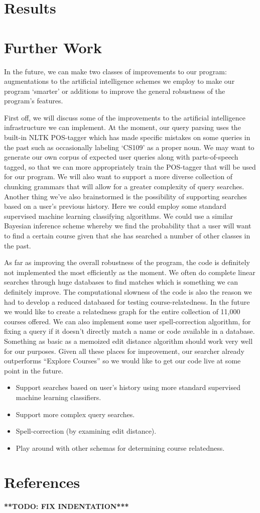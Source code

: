\documentclass[12pt]{article}
\newcommand{\todo}[1]{{\Large \bf ***TODO: #1***}}
\begin{document}
\section*{Results}
	
\section*{Further Work}

In the future, we can make two classes of improvements to our program: augmentations to 
the artificial intelligence schemes we employ to make our program `smarter' or additions to
improve the general robustness of the program's features.

First off, we will discuss some of the improvements to the artificial intelligence infrastructure
we can implement. At the moment, our query parsing uses the built-in NLTK POS-tagger which
has made specific mistakes on some queries in the past such as occasionally labeling `CS109' as a proper noun. We may want to generate our own corpus of expected user queries along with parts-of-speech tagged, so that we can more appropriately train the POS-tagger that will be used for our program. We will also want to support a more diverse collection of chunking grammars that will allow for a greater complexity of query searches. Another thing we've also brainstormed is the possibility of supporting searches based on a user's previous history. Here we could employ some standard supervised machine learning classifying algorithms. We could use a similar Bayesian inference scheme whereby we find the probability that a user will want to find a certain course given that she has searched a number of other classes in the past.

As far as improving the overall robustness of the program, the code is definitely not implemented the most efficiently as the moment. We often do complete linear searches through huge databases to find matches which is something we can definitely improve. The computational slowness of the code is also the reason we had to develop a reduced databased for testing course-relatedness. In the future we would like to create a relatedness graph for the entire collection of 11,000 courses offered. We can also implement some user spell-correction algorithm, for fixing a query if it doesn't directly match a name or code available in a database. Something as basic as a memoized edit distance algorithm should work very well for our purposes. Given all these places for improvement, our searcher already outperforms ``Explore Courses'' so we would like to get our code live at some point in the future.
\begin{itemize}
\item Support searches based on user's history using more standard supervised machine learning classifiers.
\item Support more complex query searches.
\item Spell-correction (by examining edit distance).
\item Play around with other schemas for determining course relatedness.
\end{itemize}

\section*{References}
\todo{FIX INDENTATION}
\end{document}
